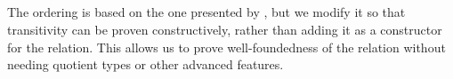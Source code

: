 \begin{code}
%
\>[6]\AgdaSpace{}%
\AgdaSymbol{:}\AgdaSpace{}%
%
\>[23]\AgdaSymbol{\{}\AgdaSpace{}%
\AgdaSymbol{\}}\AgdaSpace{}%
\AgdaSymbol{\{}\AgdaSpace{}%
\AgdaSymbol{:}\AgdaSpace{}%
\AgdaSymbol{\}}\<%
\\
\>[6][@{}l@{\AgdaIndent{0}}]%
\>[8]\AgdaSpace{}%
\AgdaSymbol{(}\AgdaSpace{}%
\AgdaSymbol{:}\AgdaSpace{}%
\AgdaSpace{}%
\AgdaSpace{}%
\AgdaSpace{}%
\AgdaSymbol{)}\<%
\\
%
\>[8]\AgdaSpace{}%
\AgdaSpace{}%
\AgdaSpace{}%
\AgdaSpace{}%
\AgdaSpace{}%
\AgdaSpace{}%
\AgdaSpace{}%
\AgdaSymbol{)}\<%
\\
%
\>[8]\AgdaSpace{}%
\AgdaSpace{}%
\AgdaSpace{}%
\AgdaSpace{}%
\AgdaSpace{}%
\<%
\\
\>[0]\<%
\end{code}
The ordering is based on the one presented by \citet{KRAUS2023113843}, but we modify it
so that transitivity can be proven constructively, rather than adding it as a constructor
for the relation. This allows us to prove well-foundedness of the relation without needing
quotient types or other advanced features.

\begin{code}%
\>[0]\<%
\\
\>[0][@{}l@{\AgdaIndent{1}}]%
\>[4]\AgdaSpace{}%
\AgdaSymbol{:}\AgdaSpace{}%
\AgdaSpace{}%
\AgdaSpace{}%
\AgdaSpace{}%
\AgdaSpace{}%
\AgdaSpace{}%
\<%
\\
%
\>[4]\AgdaSpace{}%
\AgdaSpace{}%
\AgdaSymbol{=}\AgdaSpace{}%
\<%
\\
%
\>[4]\AgdaSpace{}%
\AgdaSymbol{(}\AgdaSpace{}%
\AgdaSymbol{)}\AgdaSpace{}%
\AgdaSymbol{=}\AgdaSpace{}%
\AgdaSpace{}%
\AgdaSymbol{(}\AgdaSpace{}%
\AgdaSymbol{)}\<%
\\
%
\>[4]\AgdaSpace{}%
\AgdaSymbol{(}\AgdaSpace{}%
\AgdaSpace{}%
\AgdaSymbol{)}\AgdaSpace{}%
\AgdaSymbol{=}\AgdaSpace{}%
\AgdaSpace{}%
\AgdaSpace{}%
\AgdaSpace{}%
\AgdaSpace{}%
\AgdaSpace{}%
\AgdaSpace{}%
\AgdaSpace{}%
\AgdaSpace{}%
\AgdaSymbol{(}\AgdaSpace{}%
\AgdaSymbol{(}\AgdaSpace{}%
\AgdaSymbol{)))}\<%
\\
\>[0]\<%
\end{code}

